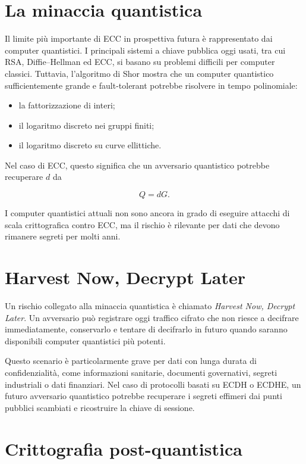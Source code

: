 \documentclass[12pt,a4paper,oneside]{report}
\begin{document}
\section{La minaccia quantistica}

Il limite più importante di ECC in prospettiva futura è rappresentato dai computer quantistici. I principali sistemi a chiave pubblica oggi usati, tra cui RSA, Diffie--Hellman ed ECC, si basano su problemi difficili per computer classici. Tuttavia, l'algoritmo di Shor mostra che un computer quantistico sufficientemente grande e fault-tolerant potrebbe risolvere in tempo polinomiale:

\begin{itemize}
    \item la fattorizzazione di interi;
    \item il logaritmo discreto nei gruppi finiti;
    \item il logaritmo discreto su curve ellittiche.
\end{itemize}

Nel caso di ECC, questo significa che un avversario quantistico potrebbe recuperare \(d\) da

\[
Q=dG.
\]

I computer quantistici attuali non sono ancora in grado di eseguire attacchi di scala crittografica contro ECC, ma il rischio è rilevante per dati che devono rimanere segreti per molti anni.

\section{Harvest Now, Decrypt Later}

Un rischio collegato alla minaccia quantistica è chiamato \textit{Harvest Now, Decrypt Later}. Un avversario può registrare oggi traffico cifrato che non riesce a decifrare immediatamente, conservarlo e tentare di decifrarlo in futuro quando saranno disponibili computer quantistici più potenti.

Questo scenario è particolarmente grave per dati con lunga durata di confidenzialità, come informazioni sanitarie, documenti governativi, segreti industriali o dati finanziari. Nel caso di protocolli basati su ECDH o ECDHE, un futuro avversario quantistico potrebbe recuperare i segreti effimeri dai punti pubblici scambiati e ricostruire la chiave di sessione.

\section{Crittografia post-quantistica}
\end{document}
